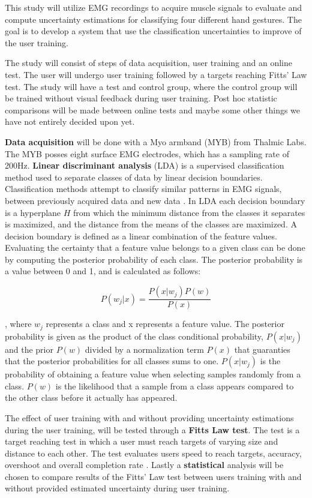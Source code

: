 This study will utilize EMG recordings to acquire muscle signals to evaluate and compute uncertainty estimations for classifying four different hand gestures. The goal is to develop a system that use the classification uncertainties to improve of the user training.

The study will consist of steps of data acquisition, user training and an online test. The user will undergo user training followed by a targets reaching Fitts' Law test. The study will have a test and control group, where the control group will be trained without visual feedback during user training. Post hoc statistic comparisons will be made between online tests and maybe some other things we have not entirely decided upon yet.

\textbf{Data acquisition} will be done with a Myo armband (MYB) from Thalmic Labs. The MYB posses eight surface EMG electrodes, which has a sampling rate of 200Hz. 
\textbf{Linear discriminant analysis} (LDA) is a supervised classification method used to separate classes of data by linear decision boundaries. Classification methods attempt to classify similar patterns in EMG signals, between previously acquired data and new data \cite{Mendez2017}. In LDA each decision boundary is a hyperplane $H$ from which the minimum distance from the classes it separates is maximized, and the distance from the means of the classes are maximized. A decision boundary is defined as a linear combination of the feature values.
Evaluating the certainty that a feature value belongs to a given class can be done by computing the posterior probability of each class. The posterior probability is a value between 0 and 1, and is calculated as follows:

\begin{equation}
	P(w_j|x) = \frac{P(x|w_j)P(w)}{P(x)}
\end{equation}

, where $w_j$ represents a class and x represents a feature value. The posterior probability is given as the product of the class conditional probability, $P(x|w_j)$ and the prior $P(w)$ divided by a normalization term $P(x)$ that guaranties that the posterior probabilities for all classes sums to one. $P(x|w_j)$ is the probability of obtaining a feature value when selecting samples randomly from a class. $P(w)$ is the likelihood that a sample from a class appears compared to the other class before it actually has appeared.

The effect of user training with and without providing uncertainty estimations during the user training, will be tested through a \textbf{Fitts Law test}. The test is a target reaching test in which a user must reach targets of varying size and distance to each other. The test evaluates users speed to reach targets, accuracy, overshoot and overall completion rate \cite{Scheme2013}. 
Lastly a \textbf{statistical} analysis will be chosen to compare results of the Fitts’ Law test between users training with and without provided estimated uncertainty during user training.


